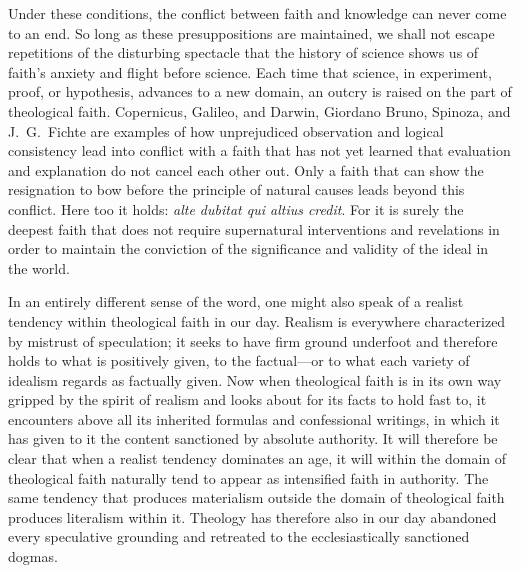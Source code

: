 \documentclass[12pt,a4paper]{article}
\begin{document}
Under these conditions, the conflict between faith and knowledge can
never come to an end. So long as these presuppositions are maintained,
we shall not escape repetitions of the disturbing spectacle that the
history of science shows us of faith's anxiety and flight before science.
Each time that science, in experiment, proof, or hypothesis, advances to
a new domain, an outcry is raised on the part of theological faith.
Copernicus, Galileo, and Darwin, Giordano Bruno, Spinoza, and J.\ G.\
Fichte are examples of how unprejudiced observation and logical
consistency lead into conflict with a faith that has not yet learned that
evaluation and explanation do not cancel each other out. Only a faith that
can show the resignation to bow before the principle of natural causes
leads beyond this conflict. Here too it holds: \textit{alte dubitat qui
altius credit}. For it is surely the deepest faith that does not require
supernatural interventions and revelations in order to maintain the
conviction of the significance and validity of the ideal in the world.

In an entirely different sense of the word, one might also speak of a
realist tendency within theological faith in our day. Realism is
everywhere characterized by mistrust of speculation; it seeks to have
firm ground underfoot and therefore holds to what is positively given, to
the factual---or to what each variety of idealism regards as factually
given. Now when theological faith is in its own way gripped by the spirit
of realism and looks about for its facts to hold fast to, it encounters
above all its inherited formulas and confessional writings, in which it
has given to it the content sanctioned by absolute authority. It will
therefore be clear that when a realist tendency dominates an age, it will
within the domain of theological faith naturally tend to appear as
intensified faith in authority. The same tendency that produces
materialism outside the domain of theological faith produces literalism
within it. Theology has therefore also in our day abandoned every
speculative grounding and retreated to the ecclesiastically sanctioned
dogmas.
\end{document}
